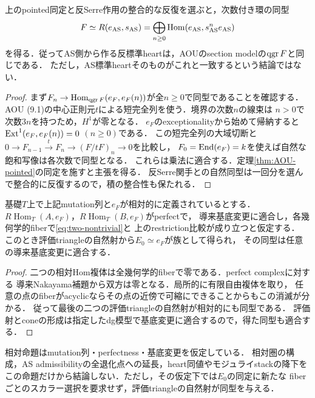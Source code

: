 \begin{corollary}[同じ反標準環の回復]\label{cor:AOU-ring}
上のpointed同定と反Serre作用の整合的な反復を選ぶと，次数付き環の同型
\[
F\simeq R(e_{\mathrm{AS}},s_{\mathrm{AS}})
=\bigoplus_{n\ge0}\operatorname{Hom}(e_{\mathrm{AS}},s_{\mathrm{AS}}^n e_{\mathrm{AS}})
\]
を得る．従ってAS側から作る反標準heartは，AOUのsection modelの$\operatorname{qgr} F$と同じである．
ただし，AS標準heartそのものがこれと一致するという結論ではない．
\end{corollary}
\begin{proof}
まず$F_n\to\operatorname{Hom}_{\operatorname{qgr} F}(e_F,e_F(n))$が全$n\ge0$で同型であることを確認する．
AOU (9.1)の中心正則元$t$による短完全列を使う．境界の次数$n$の線束は
$n>0$で次数$3n$を持つため，$H^1$が零となる．
$e_F$のexceptionalityから始めて帰納すると
$\operatorname{Ext}^1(e_F,e_F(n))=0$ $(n\ge0)$である．
この短完全列の大域切断と
$0\to F_{n-1}\xrightarrow{t}F_n\to(F/tF)_n\to0$を比較し，
$F_0=\operatorname{End}(e_F)=k$を使えば自然な飽和写像は各次数で同型となる．
これらは乗法に適合する．定理\ref{thm:AOU-pointed}の同定を施すと主張を得る．
反Serre関手との自然同型は一回分を選んで整合的に反復するので，積の整合性も保たれる．
\end{proof}

\begin{proposition}[構造対象の同定の相対版]\label{prop:AOU-relative-object}
基礎$T$上で上記mutation列と$e_F$が相対的に定義されているとする．
$R\!\operatorname{Hom}_T(A,e_F)$，$R\!\operatorname{Hom}_T(B,e_F)$がperfectで，
導来基底変更に適合し，各幾何学的fiberで\eqref{eq:two-nontrivial}と
上のrestriction比較が成り立つと仮定する．
このとき評価triangleの自然射から$E_0\simeq e_F$が族として得られ，
その同型は任意の導来基底変更に適合する．
\end{proposition}
\begin{proof}
二つの相対Hom複体は全幾何学的fiberで零である．perfect complexに対する
導来Nakayama補題から双方は零となる．局所的に有限自由複体を取り，
任意の点のfiberがacyclicならその点の近傍で可縮にできることからもこの消滅が分かる．
従って最後の二つの評価triangleの自然射が相対的にも同型である．
評価射とconeの形成は指定したdg模型で基底変更に適合するので，得た同型も適合する．
\end{proof}
\begin{remark}
相対命題はmutation列・perfectness・基底変更を仮定している．
相対圏の構成，AS admissibilityの全退化点への延長，heart同値やモジュライstackの降下を
この命題だけから結論しない．ただし，その仮定下では$E_0$の同定に新たな
fiberごとのスカラー選択を要求せず，評価triangleの自然射が同型を与える．
\end{remark}

